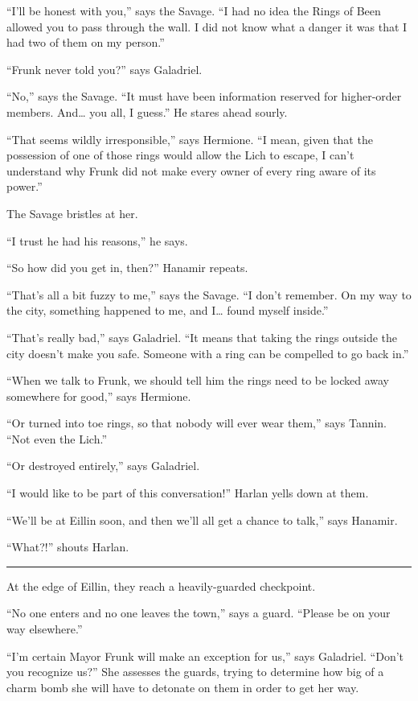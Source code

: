 \documentclass[smalldemyvopaper,11pt,twoside,onecolumn,openright,extrafontsizes]{memoir}
\begin{document}
``I'll be honest with you,'' says the Savage. ``I had no idea the Rings
of Been allowed you to pass through the wall. I did not know what a
danger it was that I had two of them on my person.''

``Frunk never told you?'' says Galadriel.

``No,'' says the Savage. ``It must have been information reserved for
higher-order members. And\ldots{} you all, I guess.'' He stares ahead
sourly.

``That seems wildly irresponsible,'' says Hermione. ``I mean, given that
the possession of one of those rings would allow the Lich to escape, I
can't understand why Frunk did not make every owner of every ring aware
of its power.''

The Savage bristles at her.

``I trust he had his reasons,'' he says.

``So how did you get in, then?'' Hanamir repeats.

``That's all a bit fuzzy to me,'' says the Savage. ``I don't remember.
On my way to the city, something happened to me, and I\ldots{} found
myself inside.''

``That's really bad,'' says Galadriel. ``It means that taking the rings
outside the city doesn't make you safe. Someone with a ring can be
compelled to go back in.''

``When we talk to Frunk, we should tell him the rings need to be locked
away somewhere for good,'' says Hermione.

``Or turned into toe rings, so that nobody will ever wear them,'' says
Tannin. ``Not even the Lich.''

``Or destroyed entirely,'' says Galadriel.

``I would like to be part of this conversation!'' Harlan yells down at
them.

``We'll be at Eillin soon, and then we'll all get a chance to talk,''
says Hanamir.

``What?!'' shouts Harlan.

\begin{center}\rule{0.5\linewidth}{\linethickness}\end{center}

At the edge of Eillin, they reach a heavily-guarded checkpoint.

``No one enters and no one leaves the town,'' says a guard. ``Please be
on your way elsewhere.''

``I'm certain Mayor Frunk will make an exception for us,'' says
Galadriel. ``Don't you recognize us?'' She assesses the guards, trying
to determine how big of a charm bomb she will have to detonate on them
in order to get her way.
\end{document}
